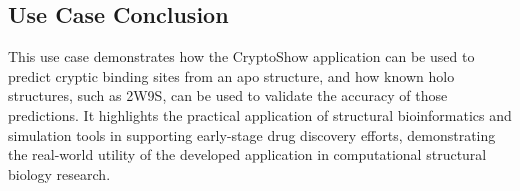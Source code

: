 \subsection{Use Case Conclusion}
\label{subsec:use-case-conclusion}

This use case demonstrates how the CryptoShow application can be used to predict cryptic binding sites from an apo structure, and how known holo structures, such as 2W9S, can be used to validate the accuracy of those predictions. It highlights the practical application of structural bioinformatics and simulation tools in supporting early-stage drug discovery efforts, demonstrating the real-world utility of the developed application in computational structural biology research.

